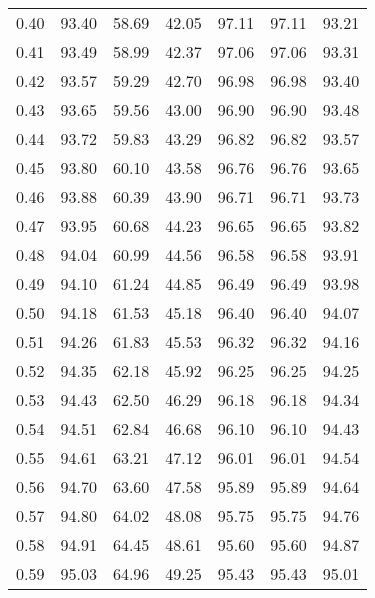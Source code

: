 \begin{tabular}{|c|c|c|c|c|c|c|}
      0.40 &     93.40 &     58.69 &      42.05 &   97.11 &      97.11 &         93.21 \\
      0.41 &     93.49 &     58.99 &      42.37 &   97.06 &      97.06 &         93.31 \\
      0.42 &     93.57 &     59.29 &      42.70 &   96.98 &      96.98 &         93.40 \\
      0.43 &     93.65 &     59.56 &      43.00 &   96.90 &      96.90 &         93.48 \\
      0.44 &     93.72 &     59.83 &      43.29 &   96.82 &      96.82 &         93.57 \\
      0.45 &     93.80 &     60.10 &      43.58 &   96.76 &      96.76 &         93.65 \\
      0.46 &     93.88 &     60.39 &      43.90 &   96.71 &      96.71 &         93.73 \\
      0.47 &     93.95 &     60.68 &      44.23 &   96.65 &      96.65 &         93.82 \\
      0.48 &     94.04 &     60.99 &      44.56 &   96.58 &      96.58 &         93.91 \\
      0.49 &     94.10 &     61.24 &      44.85 &   96.49 &      96.49 &         93.98 \\
      0.50 &     94.18 &     61.53 &      45.18 &   96.40 &      96.40 &         94.07 \\
      0.51 &     94.26 &     61.83 &      45.53 &   96.32 &      96.32 &         94.16 \\
      0.52 &     94.35 &     62.18 &      45.92 &   96.25 &      96.25 &         94.25 \\
      0.53 &     94.43 &     62.50 &      46.29 &   96.18 &      96.18 &         94.34 \\
      0.54 &     94.51 &     62.84 &      46.68 &   96.10 &      96.10 &         94.43 \\
      0.55 &     94.61 &     63.21 &      47.12 &   96.01 &      96.01 &         94.54 \\
      0.56 &     94.70 &     63.60 &      47.58 &   95.89 &      95.89 &         94.64 \\
      0.57 &     94.80 &     64.02 &      48.08 &   95.75 &      95.75 &         94.76 \\
      0.58 &     94.91 &     64.45 &      48.61 &   95.60 &      95.60 &         94.87 \\
      0.59 &     95.03 &     64.96 &      49.25 &   95.43 &      95.43 &         95.01 \\

\end{tabular}
